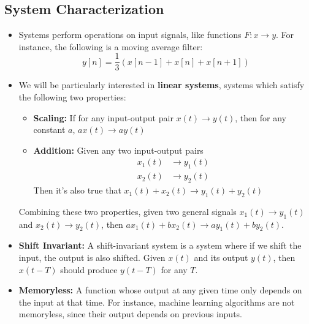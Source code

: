 \subsection{System Characterization} 
\begin{itemize}
	\item Systems perform operations on input signals, like functions \( F: x \to y \). For instance, 
		the following is a moving average filter:
		\[
			y[n] = \frac{1}{3}(x[n - 1] + x[n] + x[n + 1])
		\] 
	\item We will be particularly interested in \textbf{linear systems}, systems which satisfy the following 
		two properties:
		\begin{itemize}
			\item \textbf{Scaling:} If for any input-output pair \( x(t) \to y(t) \), then for any constant \( a \), 
				\( ax(t) \to ay(t) \)
			\item \textbf{Addition:} Given any two input-output pairs 
				\begin{align*}
					x_1(t) &\to y_1(t)\\
					x_2(t) &\to y_2(t)
				\end{align*}
				Then it's also true that \( x_1(t) + x_2(t) \to y_1(t) + y_2(t) \)
		\end{itemize}
		Combining these two properties, given two general signals \( x_1(t) \to y_1(t) \) and \( x_2(t) \to y_2(t) \), 
		then \( ax_1(t) + bx_2(t) \to ay_1(t) + by_2(t)\).

	\item \textbf{Shift Invariant:} A shift-invariant system is a system where if we shift the input, the output 
		is also shifted. Given \( x(t) \) and its output \( y(t) \), then \( x(t - T) \) should produce 
		 \( y(t -T) \) for any \( T \).
	 \item \textbf{Memoryless:} A function whose output at any given time only depends on the input at that 
		 time. For instance, machine learning algorithms are not memoryless, since their output depends on 
		 previous inputs. 



\end{itemize}
